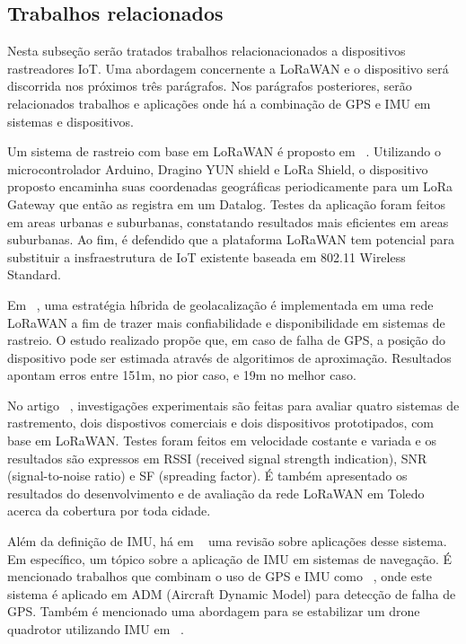 \subsection{Trabalhos relacionados}

Nesta subseção serão tratados trabalhos relacionacionados a dispositivos rastreadores IoT. Uma abordagem concernente a LoRaWAN e o dispositivo será discorrida nos próximos três parágrafos. Nos parágrafos posteriores, serão relacionados trabalhos e aplicações onde há a combinação de GPS e IMU  em sistemas e dispositivos.


Um sistema de rastreio com base em LoRaWAN é proposto em ~\cite{Jaffar2020}. Utilizando o microcontrolador Arduino, Dragino YUN shield e LoRa Shield, o dispositivo proposto encaminha suas coordenadas geográficas periodicamente para um LoRa Gateway que então as registra em um Datalog. Testes da aplicação foram feitos em areas urbanas e suburbanas, constatando resultados mais eficientes em areas suburbanas. Ao fim, é defendido que a plataforma LoRaWAN tem potencial para substituir a insfraestrutura de IoT existente baseada em 802.11 Wireless Standard.

Em ~\cite{Pastorio2021}, uma estratégia híbrida de geolacalização é implementada em uma rede LoRaWAN a fim de trazer mais confiabilidade e disponibilidade em sistemas de rastreio. O estudo realizado propõe que, em caso de falha de GPS, a posição do dispositivo pode ser estimada através de algoritimos de aproximação. Resultados apontam erros entre 151m, no pior caso, e 19m no melhor caso.

No artigo ~\cite{Camargo21}, investigações experimentais são feitas para avaliar quatro sistemas de rastremento, dois dispostivos comerciais e dois dispositivos prototipados, com base em LoRaWAN. Testes foram feitos em velocidade costante e variada e os resultados são expressos em RSSI (received signal strength indication), SNR (signal-to-noise ratio) e SF (spreading factor). É também apresentado os resultados do desenvolvimento e de avaliação da rede LoRaWAN em Toledo acerca da cobertura por toda cidade.


Além da definição de IMU, há em ~\cite{Ahmad2013} uma revisão sobre aplicações desse sistema. Em específico, um tópico sobre a aplicação de IMU em sistemas de navegação. É mencionado trabalhos que combinam o uso de GPS e IMU como ~\cite{Bruggemann2011}, onde este sistema é aplicado em ADM (Aircraft Dynamic Model) para detecção de falha de GPS. Também é mencionado uma abordagem para se estabilizar um drone quadrotor utilizando IMU em ~\cite{Azfar2011}.

